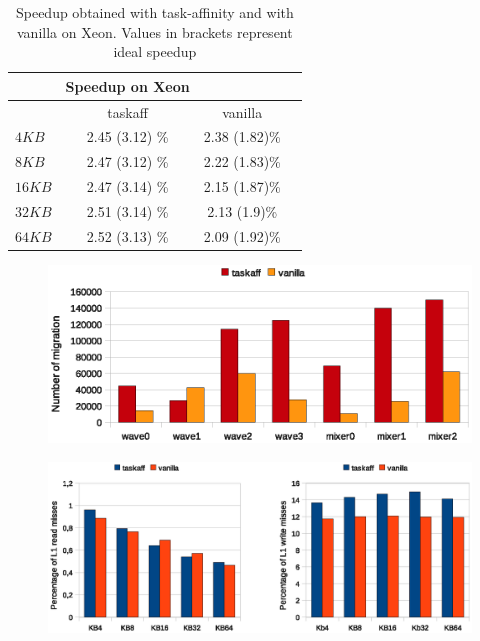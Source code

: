 \begin{table}[htbp]
\begin{center}
\begin{tabular}{l|c|c|c}
	\hline
	& Speedup on Xeon \\ \hline
	& taskaff & vanilla \\ \hline
	$4KB$ & 2.45 (3.12) \% & 2.38 (1.82)\% \\ \hline
	$8KB$ & 2.47 (3.12) \% & 2.22 (1.83)\% \\ \hline
	$16KB$ & 2.47 (3.14) \% & 2.15 (1.87)\% \\ \hline
	$32KB$  & 2.51 (3.14) \% & 2.13 (1.9)\% \\ \hline
	$64KB$  & 2.52 (3.13) \% & 2.09 (1.92)\% \\ \hline
\end{tabular}
\label{tab:speedup_xeon_i7}
\caption{Speedup obtained with task-affinity and with vanilla on Xeon. Values in brackets represent ideal speedup}
\end{center}
\end{table}

\begin{figure}[htbp]
\centering
\includegraphics[width=\widefigure]{images/results_xeon/migration_xeon.eps}
\caption{}
\label{fig:migration_xeon}
\end{figure}

\begin{figure}[htbp]
\centering
\includegraphics[width=\widefigure]{images/results_xeon/l1_load_store_xeon.eps}
\caption{}
\label{fig:l1_load_store_xeon}
\end{figure}

